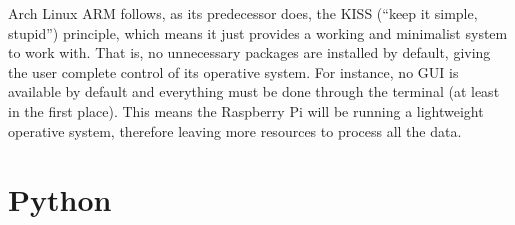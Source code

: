 Arch Linux ARM follows, as its predecessor does, the KISS (``keep it simple, stupid'') principle, which means it just provides a working and minimalist system to work with. That is, no unnecessary packages are installed by default, giving the user complete control of its operative system. For instance, no GUI is available by default and everything must be done through the terminal (at least in the first place). This means the Raspberry Pi will be running a lightweight operative system, therefore leaving more resources to process all the data.


\section{Python}
